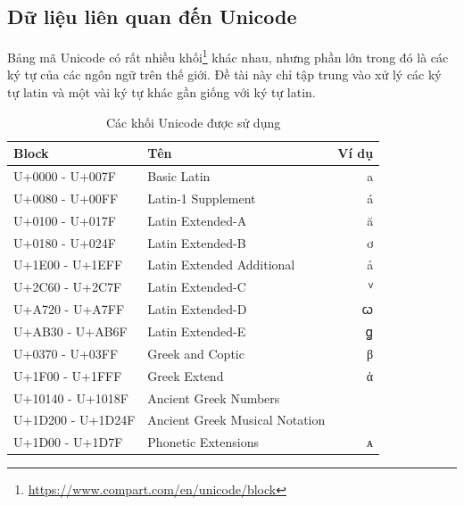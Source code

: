 \subsection*{Dữ liệu liên quan đến Unicode}
Bảng mã Unicode có rất nhiều khối\footnote{\url{https://www.compart.com/en/unicode/block}} khác nhau, nhưng phần lớn trong đó là các ký tự của các ngôn ngữ trên thế giới. Đề tài này chỉ tập trung vào xử lý các ký tự latin và một vài ký tự khác gần giống với ký tự latin.
\begin{table}[htb]
    \centering
    \caption{Các khối Unicode được sử dụng}
    \label{table:unicode-blocks}
    \begin{threeparttable}
        \begin{tabular}{llr}
            \toprule
            \textbf{Block}    & \textbf{Tên}                            & \textbf{Ví dụ} \\\midrule
            U+0000 - U+007F   & Basic Latin                             & a              \\
            U+0080 - U+00FF   & Latin-1 Supplement                      & á              \\
            U+0100 - U+017F   & Latin Extended-A                        & ă              \\
            U+0180 - U+024F   & Latin Extended-B                        & ơ              \\
            U+1E00 - U+1EFF   & Latin Extended Additional               & ả              \\
            U+2C60 - U+2C7F   & Latin Extended-C                        & ⱽ              \\
            U+A720 - U+A7FF   & Latin Extended-D                        & ꞷ              \\
            U+AB30 - U+AB6F   & Latin Extended-E                        & ꬶ              \\
            U+0370 - U+03FF   & Greek and Coptic                        & β              \\
            U+1F00 - U+1FFF   & Greek Extend                            & ἀ              \\
            U+10140 - U+1018F & Ancient Greek Numbers\tnote{1}          &                \\
            U+1D200 - U+1D24F & Ancient Greek Musical Notation\tnote{2} &                \\
            U+1D00 - U+1D7F   & Phonetic Extensions                     & ᴀ              \\

\end{tabular}
\end{threeparttable}
\end{table}

